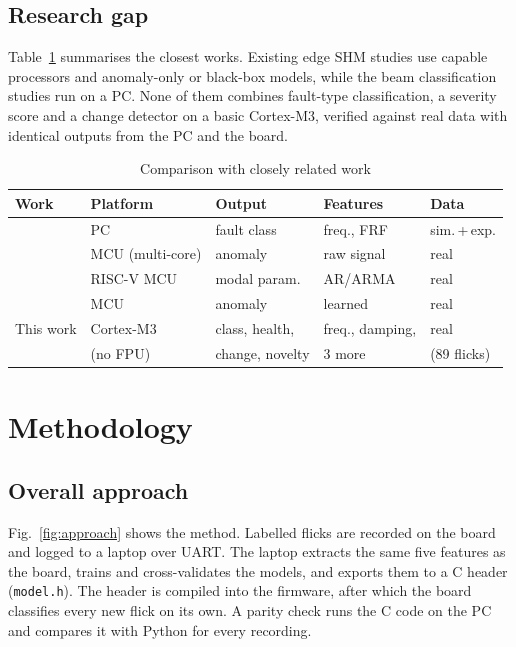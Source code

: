 \documentclass[conference]{IEEEtran}
\begin{document}
\subsection{Research gap}
Table~\ref{tab:lit} summarises the closest works. Existing edge SHM studies use capable processors and anomaly-only or black-box models, while the beam classification studies run on a PC. None of them combines fault-type classification, a severity score and a change detector on a basic Cortex-M3, verified against real data with identical outputs from the PC and the board.

\begin{table}[t]
\caption{Comparison with closely related work}
\label{tab:lit}
\centering
\footnotesize
\setlength{\tabcolsep}{3pt}
\begin{tabular}{@{}lllll@{}}
\toprule
Work & Platform & Output & Features & Data \\
\midrule
\cite{desousa2023} & PC & fault class & freq., FRF & sim.\,+\,exp. \\
\cite{burrello2022} & MCU (multi-core) & anomaly & raw signal & real \\
\cite{moallemi2023} & RISC-V MCU & modal param. & AR/ARMA & real \\
\cite{capello2025} & MCU & anomaly & learned & real \\
This work & Cortex-M3 & class, health, & freq., damping, & real \\
 & (no FPU) & change, novelty & 3 more & (89 flicks) \\
\bottomrule
\end{tabular}
\end{table}

\section{Methodology}
\subsection{Overall approach}
Fig.~\ref{fig:approach} shows the method. Labelled flicks are recorded on the board and logged to a laptop over UART. The laptop extracts the same five features as the board, trains and cross-validates the models, and exports them to a C header (\texttt{model.h}). The header is compiled into the firmware, after which the board classifies every new flick on its own. A parity check runs the C code on the PC and compares it with Python for every recording.
\end{document}
